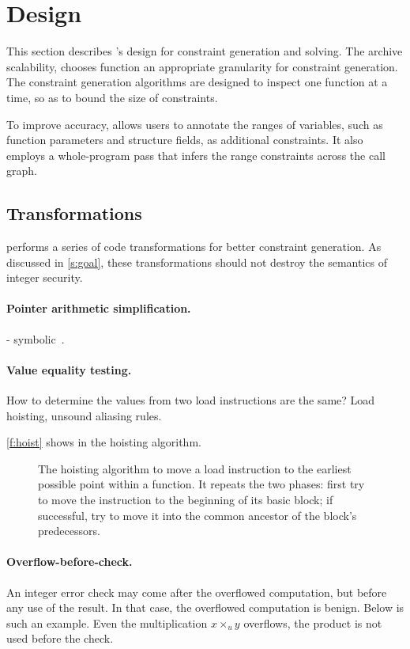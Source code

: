 \section{Design}
\label{s:gen}

This section describes \sys's design for constraint generation and
solving.  The archive scalability, \sys chooses function an appropriate
granularity for constraint generation.  The constraint generation
algorithms are designed to inspect one function at a time, so as
to bound the size of constraints.

To improve accuracy, \sys allows users to annotate the ranges of
variables, such as function parameters and structure fields, as
additional constraints. It also employs a whole-program pass that
infers the range constraints across the call graph.

\subsection{Transformations}

\sys performs a series of code transformations for better constraint
generation.  As discussed in \autoref{s:goal}, these transformations
should not destroy the semantics of integer security.

\paragraph{Pointer arithmetic simplification.}
- symbolic~\cite{engelen:symbolic}.

\paragraph{Value equality testing.}
How to determine the values from two load instructions
are the same? Load hoisting, unsound aliasing rules.

\autoref{f:hoist} shows in the hoisting algorithm.

\begin{figure}
\footnotesize

\caption{The hoisting algorithm to move a load instruction to the
earliest possible point within a function.  It repeats the two
phases: first try to move the instruction to the beginning of its
basic block; if successful, try to move it into the common ancestor
of the block's predecessors.}
\label{f:hoist}
\end{figure}

\paragraph{Overflow-before-check.}
An integer error check may come after the overflowed computation,
but before any use of the result.  In that case, the overflowed
computation is benign.  Below is such an example.  Even the
multiplication $x \times_u y$ overflows, the product  is
not used before the check.


